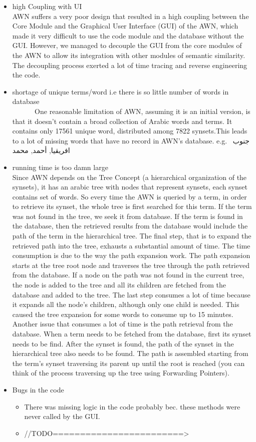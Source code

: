 \begin{itemize}
\item high Coupling with UI\\
AWN suffers a very poor design that resulted in a high coupling between the Core Module and the Graphical User Interface (GUI) of the AWN, which made it very difficult to use the code module and the database without the GUI. However, we managed to decouple the GUI from the core modules of the AWN to allow its integration with other modules of semantic similarity. The decoupling process exerted a lot of time tracing and reverse engineering the code.
\item shortage of unique terms/word i.e there is so little number of words in database\\
       One reasonable limitation of AWN, assuming it is an initial version, is that it doesn’t contain a broad collection of Arabic words and terms. It contains only 17561 unique word, distributed among 7822 synsets.This leads to a lot of missing words that have no record in AWN’s database. e.g.  جنوب افريقيا, أحمد, محمد
\item running time is too damn large\\
Since AWN depends on the Tree Concept (a hierarchical organization of the synsets), it has an arabic tree with nodes that represent synsets, each synset contains set of words. So every time the AWN is queried by a term, in order to retrieve its synset, the whole tree is first searched for this term. If the term was not found in the tree, we seek it from database. If the term is found in the database, then the retrieved results from the database would include the path of the term in the hierarchical tree. The final step, that is to expand the retrieved path into the tree, exhausts a substantial amount of time. The time consumption is due to the way the path expansion work. The path expansion starts at the tree root node and traverses the tree through the path retrieved from the database. If a node on the path was not found in the current tree, the node is added to the tree and all its children are fetched from the database and added to the tree. The last step consumes a lot of time because it expands all the node’s children, although only one child is needed. This caused the tree expansion for some words to consume up to 15 minutes.
Another issue that consumes a lot of time is the path retrieval from the database. When a term needs to be fetched from the database, first its synset needs to be find. After the synset is found, the path of the synset in the hierarchical tree also needs to be found. The path is assembled starting from the term’s synset traversing its parent up until the root is reached (you can think of the process traversing up the tree using Forwarding Pointers). 
\item Bugs in the code\\
\begin{itemize}
\item There was missing logic in the code probably bec. these methods were never called by the GUI.
\item //TODO========================>
\end{itemize}
\end{itemize}
